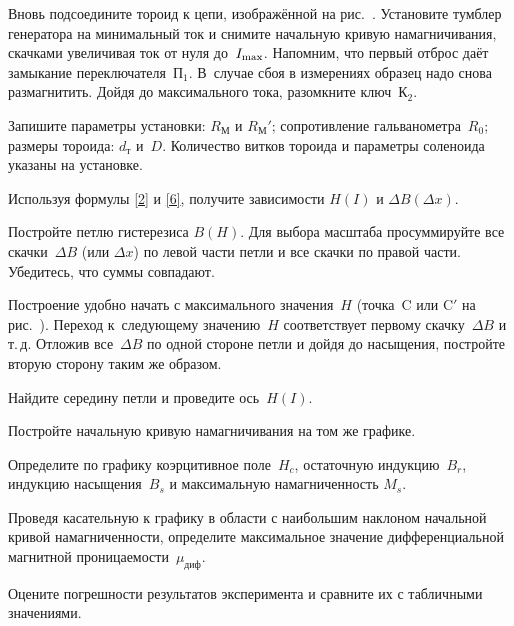 \begin{lab:task}
	\item Вновь подсоедините тороид к цепи, изображённой 
    на рис.~. Установите тумблер генератора на минимальный ток и
снимите  начальную кривую намагничивания,  скачками увеличивая ток от нуля 
до~$I_{\rm max}$. Напомним, что первый отброс даёт замыкание 
переключателя~$\text{П}_1$. В~случае сбоя в измерениях образец надо снова размагнитить.
Дойдя до максимального тока, разомкните ключ~К$_2$.

	\item Запишите параметры установки: $R_{М}$ и $R_{М}'$;
сопротивление гальванометра~$R_0$; размеры тороида: $d_{т}$ и~$D$. 
Количество витков тороида и параметры соленоида указаны на установке.


		\item Используя формулы \eqref{2} и \eqref{6}, получите зависимости
        $H(I)$ и $\Delta B(\Delta x)$.

		\item Постройте петлю гистерезиса $B(H)$. Для выбора масштаба
просуммируйте все скачки~$\Delta B$ (или $\Delta x$) по левой части
		петли и все скачки по правой части. Убедитесь, что суммы совпадают.

		Построение удобно начать с максимального значения~$H$ (точка~C или
C$'$ на рис.~). Переход к~следующему
значению~$H$ соответствует первому скачку~$\Delta B$ и т.\,д.
Отложив все~$\Delta B$ по одной стороне петли и дойдя до насыщения, постройте
вторую сторону таким же образом.

		Найдите середину петли и проведите ось~$H(I)$.

		\item Постройте начальную кривую намагничивания на том же графике.

		\item Определите по графику коэрцитивное поле~$H_c$,
        остаточную индукцию~$B_r$, индукцию насыщения~$B_s$ и 
        максимальную намагниченность $M_s$.

		\item Проведя касательную к графику в области с наибольшим наклоном 
        начальной кривой намагниченности, определите максимальное значение 
        дифференциальной магнитной проницаемости~$\mu_\text{диф}$.

		\item Оцените погрешности результатов эксперимента
        и сравните их с табличными значениями.

 

\end{lab:task}


